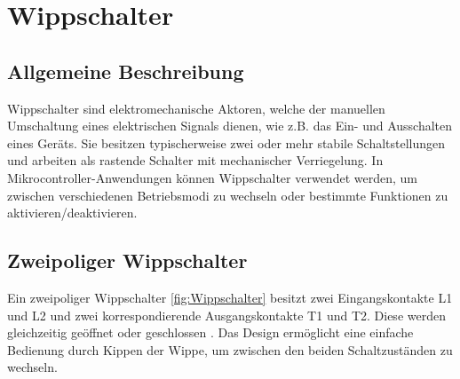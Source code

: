 %

%

\chapter{Wippschalter}
\label{ch:Wippschalter}

\section{Allgemeine Beschreibung}

Wippschalter sind elektromechanische Aktoren, welche der manuellen Umschaltung eines elektrischen Signals dienen, wie z.B. das Ein- und Ausschalten eines Geräts. Sie besitzen typischerweise zwei oder mehr stabile Schaltstellungen und arbeiten als rastende Schalter mit mechanischer Verriegelung. In Mikrocontroller-Anwendungen können Wippschalter verwendet werden, um zwischen verschiedenen Betriebsmodi zu wechseln oder bestimmte Funktionen zu aktivieren/deaktivieren.

\section{Zweipoliger Wippschalter}

Ein zweipoliger Wippschalter \ref{fig:Wippschalter} besitzt zwei Eingangskontakte L1 und L2 und zwei korrespondierende Ausgangskontakte T1 und T2. Diese werden gleichzeitig geöffnet oder geschlossen \cite{reichelt_wippschalter_1552_2021}. Das Design ermöglicht eine einfache Bedienung durch Kippen der Wippe, um zwischen den beiden Schaltzuständen zu wechseln.

